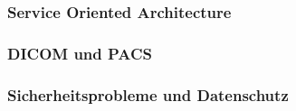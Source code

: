 \chapter{}
\label{sec:overview}
	
\subsection{Service Oriented Architecture}


\subsection{DICOM und PACS}


\subsection{Sicherheitsprobleme und Datenschutz}
